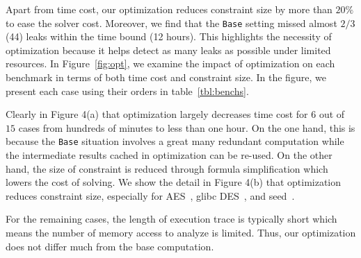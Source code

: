 \documentclass[sigconf]{acmart}
\begin{document}
Apart from time cost, our optimization reduces constraint size by more than $20\%$ to 
ease the solver cost. Moreover, we find that the \texttt{Base} setting missed almost 
$2/3$ (44) leaks within the time bound (12 hours). This highlights the necessity of 
optimization because it helps detect as many leaks as possible under limited resources. 
In Figure~\ref{fig:opt}, we examine the impact of optimization on each benchmark in 
terms of both time cost and constraint size. In the figure, we present each case using 
their orders in table~\ref{tbl:benchs}. 

Clearly in Figure 4(a) that optimization 
largely decreases time cost for $6$ out of $15$ cases from hundreds of minutes to less
than one hour. On the one hand, this is because the \texttt{Base} situation involves
a great many redundant computation while the intermediate results cached in optimization 
can be re-used. On the other hand, the size of constraint is reduced through formula 
simplification which lowers the cost of solving. We show the detail in Figure 4(b)
that optimization reduces constraint size, especially for AES~\cite{LibTomCrypt}, glibc DES~\cite{glibc}, and seed~\cite{Tegra}. 

For the remaining cases, the length of execution 
trace is typically short which means the number of memory access to analyze is limited. 
Thus, our optimization does not differ much from the base computation.
\end{document}
